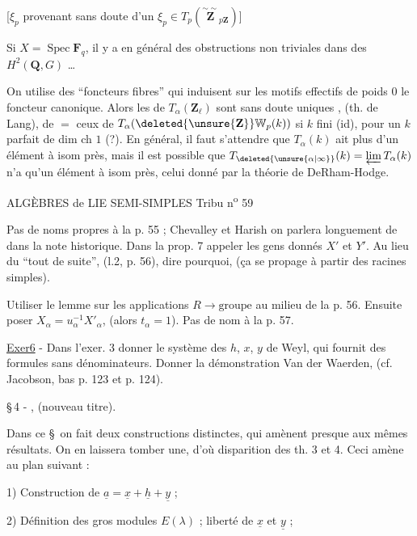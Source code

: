 [$\xi_p$ provenant sans doute d'un $\xi_p\in T_p(\overset{\sim\!\sim}{\mathbf Z}_{p\mathbf Z})$]

Si $X=\operatorname{Spec}\mathbf F_q$, il y a en général des  obstructions non triviales dans des $H^2(\mathbf Q,G)$ \ldots

 On utilise des ``foncteurs fibres'' qui induisent sur les motifs effectifs de poids $0$ le foncteur canonique. Alors les  de $T_\alpha(\mathbf Z_\ell)$ sont sans doute uniques , (th. de Lang), de $=$ ceux de $T_\alpha(\deleted{\unsure{\mathbf Z}}\mathbb{W}_p(k))$ si $k$ fini (id),  pour un $k$ parfait de dim ch $1$ (?). En général, il faut s'attendre que $T_\alpha(k)$  ait plus d'un élément à isom près, mais il est possible que $T_{\deleted{\unsure{\alpha|\infty}}}(k)=\varprojlim T_\alpha(k)$ n'a qu'un élément à isom près, celui donné par la théorie de DeRham-Hodge.

ALGÈBRES de LIE SEMI-SIMPLES \hfill Tribu n\textsuperscript{o} 59

Pas de noms propres à la p. 55 ; Chevalley et Harish on parlera longuement de dans la note historique. Dans la prop. 7 appeler les gens donnés $X'$ et $Y'$. Au lieu du ``tout de suite'', (l.2, p. 56), dire pourquoi, (ça se propage à partir des racines simples).

Utiliser le lemme sur les applications $R\longrightarrow\text{groupe}$ au milieu de la p. 56. Ensuite poser $X_\alpha=u_\alpha^{-1}X'_\alpha$, (alors $t_\alpha=1$). Pas de nom à la p. 57.

\uline{Exer6} - Dans l'exer. 3 donner le système des $h$, $x$, $y$ de Weyl, qui fournit des formules sans dénominateurs. Donner la démonstration Van der Waerden, (cf. Jacobson, bas p. 123 et p. 124).

\S\,4 - , (nouveau titre).

Dans ce \S\ on fait deux constructions distinctes, qui amènent presque aux mêmes résultats. On en laissera tomber une, d'où disparition des th. 3 et 4. Ceci amène au plan suivant :

1) Construction de $\underline{a}=\underline{x}+\underline{h}+\underline{y}$ ;

2) Définition des gros modules $E(\lambda)$ ; liberté de $\underline{x}$ et $\underline{y}$ ;

